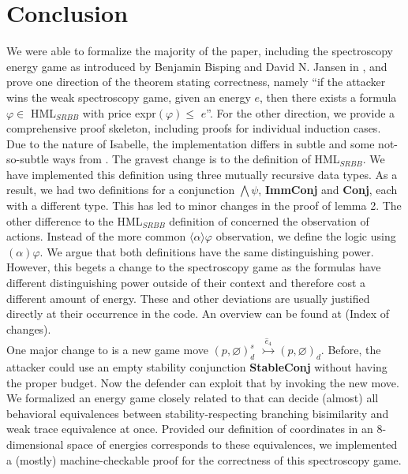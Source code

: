 \section{Conclusion}
We were able to formalize the majority of the paper, including the spectroscopy energy game as introduced by Benjamin Bisping and David N. Jansen in \cite{bisping2023lineartimebranchingtime}, 
and prove one direction of the theorem stating correctness, namely ``if the attacker wins the weak spectroscopy game, given an energy $e$, then there exists a formula $\varphi \in$ HML$_{SRBB}$ with price expr$(\varphi) \leq$ $e$''. 
For the other direction, we provide a comprehensive proof skeleton, including proofs for individual induction cases.
\\
Due to the nature of Isabelle, the implementation differs in subtle and some not-so-subtle ways from \cite{bisping2023lineartimebranchingtime}. The gravest change is to the definition of HML$_{SRBB}$. 
We have implemented this definition using three mutually recursive data types. As a result, we had two definitions for a conjunction $\bigwedge\psi$, \textbf{ImmConj} and \textbf{Conj}, each with a different type. 
This has led to minor changes in the proof of lemma 2. The other difference to the HML$_{SRBB}$ definition of \cite{bisping2023lineartimebranchingtime} concerned the observation of actions. 
Instead of the more common $\langle \alpha \rangle\varphi$ observation, we define the logic using $(\alpha)\varphi$. We argue that both definitions have the same distinguishing power. However, 
this begets a change to the spectroscopy game as the formulas have different distinguishing power outside of their context and therefore cost a different amount of energy.
These and other deviations are usually justified directly at their occurrence in the code. An overview can be found at (Index of changes). 
\\
One major change to \cite{bisping2023lineartimebranchingtime} is a new game move $(p,\varnothing)_{d}^{s}$ $\overset{\hat{e}_4}{\rightarrowtail} (p,\varnothing)_d$. 
Before, the attacker could use an empty stability conjunction \textbf{StableConj} without having the proper budget. Now the defender can exploit that by invoking the new move.
\\
We formalized an energy game closely related to \cite{bisping2023lineartimebranchingtime} that can decide (almost) all behavioral equivalences between stability-respecting branching bisimilarity and weak trace equivalence at once.
Provided our definition of coordinates in an 8-dimensional space of energies corresponds to these equivalences, we implemented a (mostly) machine-checkable proof for the correctness of this spectroscopy game.